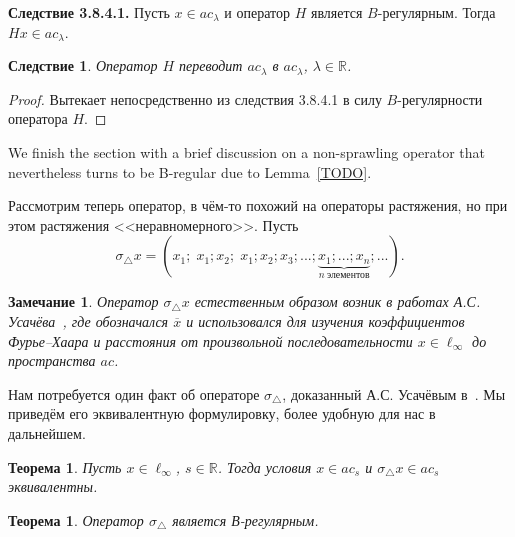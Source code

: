 \documentclass[a4paper,14pt]{article} %
\newcommand{\R}{\ensuremath{\mathbb{R}}}
\theoremstyle{plain}
\newtheorem{theorem}[lemma]{Теорема}
\newtheorem{remark}[lemma]{Замечание}
\newtheorem{corollary}{Следствие}[lemma]
\begin{document}
	{\bf Следствие 3.8.4.1.} Пусть $x \in ac_\lambda$ и оператор $H$ является $B$-регулярным. Тогда $Hx \in ac_\lambda$.

	\begin{corollary}
		Оператор $H$ переводит $ac_\lambda$ в $ac_\lambda$, $\lambda \in \mathbb R$.
	\end{corollary}

	\begin{proof}
		Вытекает непосредственно из следствия 3.8.4.1 в силу $B$-регулярности оператора $H$.
	\end{proof}

	We finish the section with a brief discussion on a non-sprawling operator
	that nevertheless turns to be B-regular due to Lemma~\ref{TODO}.

	Рассмотрим теперь оператор,
	в чём-то похожий на операторы растяжения,
	но при этом растяжения <<неравномерного>>.
	Пусть
	\begin{equation}
		\sigma_\triangle x =
		(x_1; \; x_1; x_2; \; x_1; x_2; x_3; ... ; \underbrace{x_1; ...; x_n}_{n~\mbox{элементов}}; ...)
		.
	\end{equation}

	\begin{remark}
		Оператор $\sigma_\triangle x$ естественным образом возник в работах А.С. Усачёва~\cite{usachev2009_phd_vsu},
		где обозначался $\overline{x}$ и
		использовался для изучения коэффициентов Фурье--Хаара
		и расстояния от произвольной последовательности $x\in\ell_\infty$
		до пространства $ac$.
	\end{remark}

	Нам потребуется один факт об операторе $\sigma_\triangle$,
	доказанный А.С. Усачёвым в~\cite[теорема 19]{usachev2009_phd_vsu}.
	Мы приведём его эквивалентную формулировку, более удобную для нас в дальнейшем.

	\begin{theorem}
		\label{thm:usachev_overline_x_ac_s}
		Пусть $x\in\ell_\infty$, $s\in\R$.
		Тогда условия $x\in ac_s$ и $\sigma_\triangle x \in ac_s$ эквивалентны.
	\end{theorem}

	\begin{theorem}
		Оператор $\sigma_\triangle$ является В-регулярным.
	\end{theorem}
\end{document}
